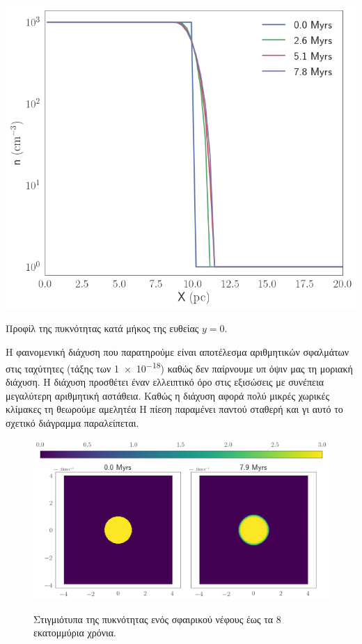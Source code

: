  \begin{marginfigure}
 	\centering
 	\includegraphics[width=1.0\linewidth]{DataImages/NoCoolingRHOprofile}
 	\caption{Προφίλ της πυκνότητας κατά μήκος της ευθείας $y=0$.}
 	\label{fig:nocoolingrhoprofile}
 \end{marginfigure}	
 
  Η φαινομενική διάχυση που παρατηρούμε είναι αποτέλεσμα αριθμητικών σφαλμάτων στις ταχύτητες (τάξης των \num{1e-18}) καθώς δεν παίρνουμε υπ όψιν μας τη μοριακή διάχυση. Η διάχυση προσθέτει έναν ελλειπτικό όρο στις εξισώσεις με συνέπεια μεγαλύτερη αριθμητική αστάθεια. Καθώς η διάχυση αφορά πολύ μικρές χωρικές κλίμακες τη θεωρούμε αμελητέα  
  Η πίεση παραμένει παντού σταθερή και γι αυτό το σχετικό διάγραμμα παραλείπεται.  
 	
	\begin{figure}[h]
		\centering
		\includegraphics[width=1.0\linewidth]{DataImages/NoCoolingRHOquad}
		\label{fig:NoCoolingRHOquad}
		\caption{Στιγμιότυπα της πυκνότητας ενός σφαιρικού νέφους έως τα 8 εκατομμύρια χρόνια.}
	\end{figure}	
	
